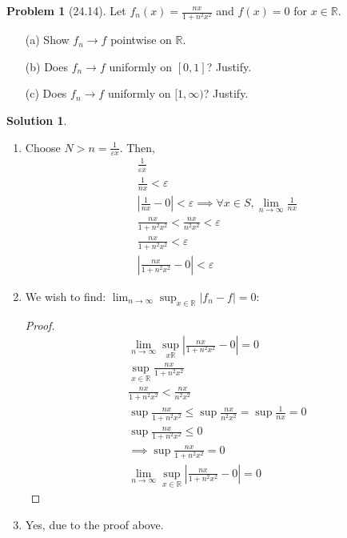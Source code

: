 \documentclass[12pt]{article}
\theoremstyle{definition} %
\newtheorem{solution}{Solution}
\newtheorem{problem}{Problem}
\theoremstyle{plain} %
\begin{document}
\begin{problem}[24.14]
    Let $ f_n(x) = \frac{nx}{1 + n^2 x^2} $ and $ f(x) = 0 $ for $ x \in \mathbb{R} $.

\begin{enumerate}
    \item[(a)] Show $ f_n \to f $ pointwise on $ \mathbb{R} $.
    \item[(b)] Does $ f_n \to f $ uniformly on $ [0, 1] $? Justify.
    \item[(c)] Does $ f_n \to f $ uniformly on $ [1, \infty) $? Justify.
\end{enumerate}
\end{problem}
\begin{solution}
    \begin{enumerate}
        \item Choose $N>n=\frac{1}{\varepsilon x}$. Then,
        \begin{align}
           \frac{1}{\varepsilon x} \\[10pt] 
           \frac{1}{nx}<\varepsilon \\[10pt] 
           \left\vert \frac{1}{nx}-0 \right\vert < \varepsilon \implies \forall x\in S, \lim_{n \to \infty} \frac{1}{nx}\\[10pt] 
           \frac{nx}{1+n^{2}x^{2}}<\frac{nx}{n^{2}x^{2}}<\varepsilon \\[10pt] 
           \frac{nx}{1+n^{2}x^{2}}<\varepsilon \\[10pt] 
           \left\vert \frac{nx}{1+n^{2}x^{2}}-0 \right\vert < \varepsilon
        \end{align}
        \item We wish to find: $\lim_{n \to \infty} \sup_{x\in\mathbb{R}}\left\vert f_{n}-f \right\vert =0$:
        \begin{proof}
            \begin{align}
                \lim_{n \to \infty} \sup_{x\mathbb{R}}\left\vert \frac{nx}{1+n^{2}x^{2}}-0 \right\vert =0 \\[10pt] 
                \sup_{x\in \mathbb{R}}\frac{nx}{1+n^{2}x^{2}} \\[10pt] 
                \frac{nx}{1+n^{2}x^{2}}<\frac{nx}{n^{2}x^{2}} \\[10pt] 
                \sup \frac{nx}{1+n^{2}x^{2}}\leq \sup \frac{nx}{n^{2}x^{2}} = \sup \frac{1}{nx}=0\\[10pt] 
                \sup \frac{nx}{1+n^{2}x^{2}} \leq 0 \\[10pt] 
                \implies \sup \frac{nx}{1+n^{2}x^{2}}=0 \\[10pt] 
                \lim_{n \to \infty} \sup_{x\in \mathbb{R} } \left\vert \frac{nx}{1+n^{2}x^{2}}-0 \right\vert =0
            \end{align} 
        \end{proof}
    \item Yes, due to the proof above.
    \end{enumerate}
\end{solution}
\end{document}
